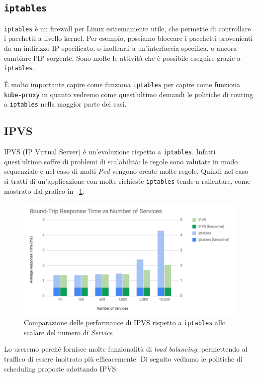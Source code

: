 \documentclass[12pt, hidelinks]{report}
\begin{document}
\subsection{\texttt{iptables}}
\texttt{iptables} è un firewall per Linux estremamente utile, che permette di controllare i pacchetti a livello kernel. Per esempio, possiamo bloccare i pacchetti provenienti da un indirizzo IP specificato, o inoltrarli a un'interfaccia specifica, o ancora cambiare l'IP sorgente. Sono molte le attività che è possibile eseguire grazie a \texttt{iptables}.

È molto importante capire come funziona \texttt{iptables} per capire come funziona \texttt{kube-proxy} in quanto vedremo come quest'ultimo demandi le politiche di routing a \texttt{iptables} nella maggior parte dei casi.

\subsection{IPVS}
IPVS (IP Virtual Server) è un'evoluzione rispetto a \texttt{iptables}. Infatti quest'ultimo soffre di problemi di scalabilità: le regole sono valutate in modo sequenziale e nel caso di molti \textit{Pod} vengono create molte regole. Quindi nel caso si tratti di un'applicazione con molte richieste \texttt{iptables} tende a rallentare, come mostrato dal grafico in \figurename~\ref{fig:ipvs-vs-iptables}.

\begin{figure}[H]
    \centering
    \includegraphics[width=\linewidth]{6-ipvs-vs-iptables.png}
    \caption{Comparazione delle performance di IPVS rispetto a \texttt{iptables} allo scalare del numero di \textit{Service} \cite{tigera-ipvs}}
    \label{fig:ipvs-vs-iptables}
\end{figure}

Lo useremo perché fornisce molte funzionalità di \textit{load balancing}, permettendo al traffico di essere inoltrato più efficacemente. Di seguito vediamo le politiche di scheduling proposte adottando IPVS:
\end{document}
